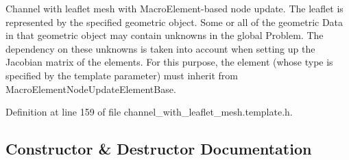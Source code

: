 Channel with leaflet mesh with Macro\+Element-\/based node update. The leaflet is represented by the specified geometric object. Some or all of the geometric Data in that geometric object may contain unknowns in the global Problem. The dependency on these unknowns is taken into account when setting up the Jacobian matrix of the elements. For this purpose, the element (whose type is specified by the template parameter) must inherit from Macro\+Element\+Node\+Update\+Element\+Base. 

Definition at line 159 of file channel\+\_\+with\+\_\+leaflet\+\_\+mesh.\+template.\+h.



\subsection{Constructor \& Destructor Documentation}
\mbox{\label{classoomph_1_1MacroElementNodeUpdateChannelWithLeafletMesh_a8b2ddfc283a8f1ff6927c7a0c7f0ed21}} 
